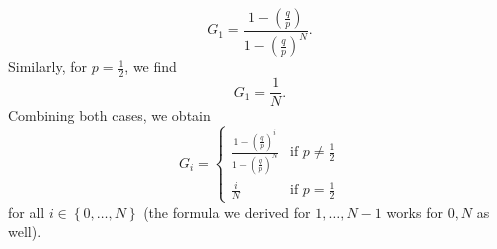 \documentclass[stat333]{subfiles}
\begin{document}
\begin{subproof}[Answer]
\begin{equation*}
            G_1 = \frac{1-\left( \frac{q}{p} \right)}{1-\left( \frac{q}{p} \right)^N}.
        \end{equation*}
        Similarly, for $p=\frac{1}{2}$, we find
        \begin{equation*}
            G_1 = \frac{1}{N}.
        \end{equation*}
        Combining both cases, we obtain
        \begin{equation*}
            G_i = 
            \begin{cases} 
                \frac{1-\left( \frac{q}{p} \right)^i}{1-\left( \frac{q}{p} \right)^N} & \text{if $p\neq \frac{1}{2}$} \\
                \frac{i}{N} & \text{if $p=\frac{1}{2}$}
            \end{cases}
        \end{equation*}
        for all $i\in\left\lbrace 0,\ldots,N \right\rbrace$ (the formula we derived for $1,\ldots,N-1$ works for $0,N$ as well).
    \end{subproof}
\end{document}
